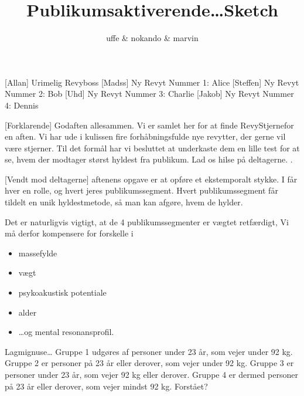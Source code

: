\documentclass[a4paper,11pt]{article}
\title{Publikumsaktiverende\ldots Sketch}
\author{uffe \&  nokando \&  marvin}
\begin{document}
\maketitle
\begin{roles}
[Allan] Urimelig Revyboss
[Madss] Ny Revyt Nummer 1: Alice
[Steffen] Ny Revyt Nummer 2: Bob
[Uhd] Ny Revyt Nummer 3: Charlie
[Jakob] Ny Revyt Nummer 4: Dennis
\end{roles}

\begin{props}
\end{props}


\begin{sketch}



[Forklarende] Godaften allesammen. Vi er samlet her for at
finde RevyStjerne\texttrademark for en aften. Vi har ude i kulissen
fire forhåbningsfulde nye revytter, der gerne vil være stjerner. Til
det formål har vi besluttet at underkaste dem en lille test for at se,
hvem der modtager størst hyldest fra publikum. Lad os hilse på
deltagerne. .


[Vendt mod deltagerne] aftenens opgave er at opføre et
ekstemporalt stykke. I får hver en rolle, og hvert jeres
publikumssegment. Hvert publikumssegment får tildelt en unik
hyldestmetode, så man kan afgøre, hvem de hylder.

Det er naturligvis vigtigt, at de 4 publikumssegmenter er vægtet
retfærdigt, Vi må derfor kompensere for forskelle i 
\begin{itemize}
  \item massefylde
  \item vægt
  \item psykoakustisk potentiale
  \item alder
  \item \ldots og mental resonansprofil.
\end{itemize} 


  Lagmignuse\ldots
Gruppe 1 udgøres af personer under 23 år, som vejer under 92 kg.
Gruppe 2 er personer på 23 år eller derover, som vejer under 92 kg.
Gruppe 3 er personer under 23 år, som vejer 92 kg eller derover.
Gruppe 4 er dermed personer på 23 år eller derover, som vejer mindst
92 kg. Forstået?


\end{sketch}
\end{document}
